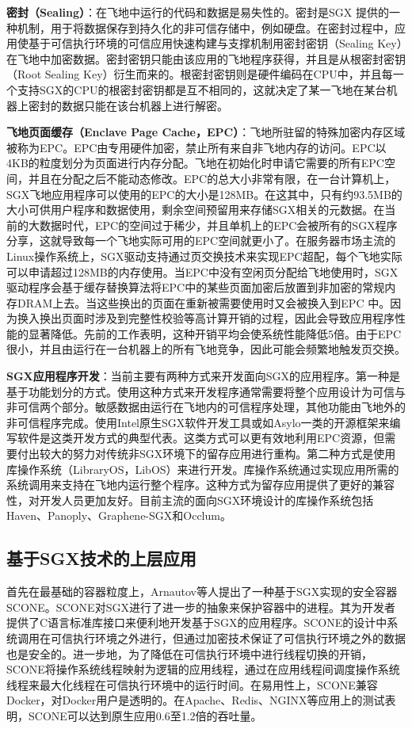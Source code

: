 \textbf{密封（Sealing）}：在飞地中运行的代码和数据是易失性的。密封是SGX 提供的一种机制，用于将数据保存到持久化的非可信存储中，例如硬盘。在密封过程中，应用使基于可信执行环境的可信应用快速构建与支撑机制用密封密钥（Sealing Key）在飞地中加密数据。密封密钥只能由该应用的飞地程序获得，并且是从根密封密钥（Root Sealing Key）衍生而来的。根密封密钥则是硬件编码在CPU中，并且每一个支持SGX的CPU的根密封密钥都是互不相同的，这就决定了某一飞地在某台机器上密封的数据只能在该台机器上进行解密。

\textbf{飞地页面缓存（Enclave Page Cache，EPC）}：飞地所驻留的特殊加密内存区域被称为EPC。EPC由专用硬件加密，禁止所有来自非飞地内存的访问。EPC以4KB的粒度划分为页面进行内存分配。飞地在初始化时申请它需要的所有EPC空间，并且在分配之后不能动态修改。EPC的总大小非常有限，在一台计算机上，SGX飞地应用程序可以使用的EPC的大小是128MB。在这其中，只有约93.5MB的大小可供用户程序和数据使用，剩余空间预留用来存储SGX相关的元数据。在当前的大数据时代，EPC的空间过于稀少，并且单机上的EPC会被所有的SGX程序分享，这就导致每一个飞地实际可用的EPC空间就更小了。在服务器市场主流的Linux操作系统上，SGX驱动支持通过页交换技术来实现EPC超配，每个飞地实际可以申请超过128MB的内存使用。当EPC中没有空闲页分配给飞地使用时，SGX驱动程序会基于缓存替换算法将EPC中的某些页面加密后放置到非加密的常规内存DRAM上去。当这些换出的页面在重新被需要使用时又会被换入到EPC 中。因为换入换出页面时涉及到完整性校验等高计算开销的过程，因此会导致应用程序性能的显著降低。先前的工作表明，这种开销平均会使系统性能降低5倍。由于EPC很小，并且由运行在一台机器上的所有飞地竞争，因此可能会频繁地触发页交换。

\textbf{SGX应用程序开发}：当前主要有两种方式来开发面向SGX的应用程序。第一种是基于功能划分的方式。使用这种方式来开发程序通常需要将整个应用设计为可信与非可信两个部分。敏感数据由运行在飞地内的可信程序处理，其他功能由飞地外的非可信程序完成。使用Intel原生SGX软件开发工具或如Asylo一类的开源框架来编写软件是这类开发方式的典型代表。这类方式可以更有效地利用EPC资源，但需要付出较大的努力对传统非SGX环境下的留存应用进行重构。第二种方式是使用库操作系统（LibraryOS，LibOS）来进行开发。库操作系统通过实现应用所需的系统调用来支持在飞地内运行整个程序。这种方式为留存应用提供了更好的兼容性，对开发人员更加友好。目前主流的面向SGX环境设计的库操作系统包括Haven、Panoply、Graphene-SGX和Occlum。

\subsection{基于SGX技术的上层应用}

首先在最基础的容器粒度上，Arnautov等人提出了一种基于SGX实现的安全容器SCONE。SCONE对SGX进行了进一步的抽象来保护容器中的进程。其为开发者提供了C语言标准库接口来便利地开发基于SGX的应用程序。SCONE的设计中系统调用在可信执行环境之外进行，但通过加密技术保证了可信执行环境之外的数据也是安全的。进一步地，为了降低在可信执行环境中进行线程切换的开销，SCONE将操作系统线程映射为逻辑的应用线程，通过在应用线程间调度操作系统线程来最大化线程在可信执行环境中的运行时间。在易用性上，SCONE兼容Docker，对Docker用户是透明的。在Apache、Redis、NGINX等应用上的测试表明，SCONE可以达到原生应用0.6至1.2倍的吞吐量。

